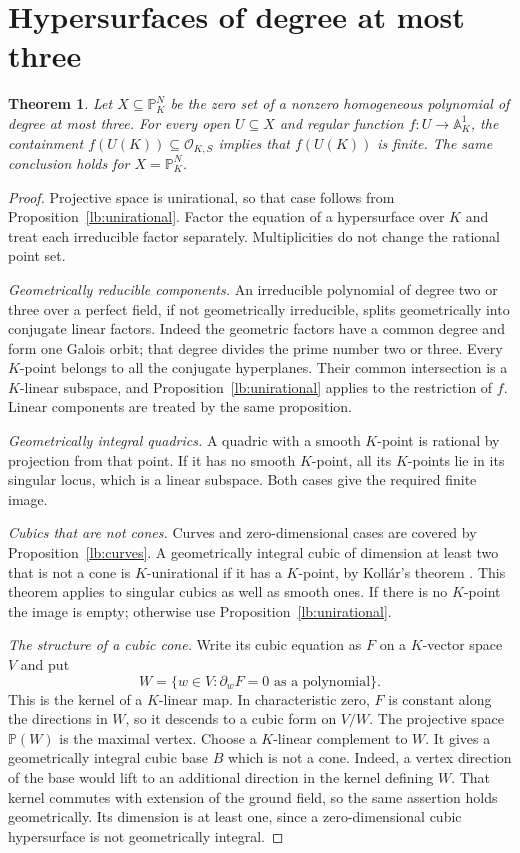 \documentclass[11pt,a4paper]{article}
\newtheorem{theorem}{Theorem}[section]
\theoremstyle{definition}
\newcommand{\OKS}{\mathcal O_{K,S}}
\newcommand{\A}{\mathbb A}
\newcommand{\PP}{\mathbb P}
\begin{document}
\section{Hypersurfaces of degree at most three}

\begin{theorem}\label{lb:cubic}
Let $X\subseteq\PP^N_K$ be the zero set of a nonzero homogeneous
polynomial of degree at most three. For every open $U\subseteq X$
and regular function $f:U\to\A^1_K$, the containment
$f(U(K))\subseteq\OKS$ implies that $f(U(K))$ is finite.
The same conclusion holds for $X=\PP^N_K$.
\end{theorem}
\begin{proof}
Projective space is unirational, so that case follows from
Proposition~\ref{lb:unirational}. Factor the equation of a hypersurface
over $K$ and treat each irreducible factor separately. Multiplicities
do not change the rational point set.

\emph{Geometrically reducible components.}
An irreducible polynomial of degree two or three over a perfect
field, if not geometrically irreducible, splits geometrically into
conjugate linear factors. Indeed the geometric factors have a common
degree and form one Galois orbit; that degree divides the prime
number two or three. Every $K$-point belongs to all the conjugate
hyperplanes. Their common intersection is a $K$-linear subspace,
and Proposition~\ref{lb:unirational} applies to the restriction of $f$.
Linear components are treated by the same proposition.

\emph{Geometrically integral quadrics.}
A quadric with a smooth $K$-point is rational by projection from
that point. If it has no smooth $K$-point, all its $K$-points lie
in its singular locus, which is a linear subspace. Both cases
give the required finite image.

\emph{Cubics that are not cones.}
Curves and zero-dimensional cases are covered by
Proposition~\ref{lb:curves}. A geometrically integral cubic of
dimension at least two that is not a cone is $K$-unirational if
it has a $K$-point, by Koll\'ar's theorem \cite[Theorem~2]{Kollar}.
This theorem applies to singular cubics as well as smooth ones.
If there is no $K$-point the image is empty; otherwise use
Proposition~\ref{lb:unirational}.

\emph{The structure of a cubic cone.}
Write its cubic equation as $F$ on a $K$-vector space $V$ and put
\[
 W=\{w\in V:\partial_wF=0\text{ as a polynomial}\}.
\]
This is the kernel of a $K$-linear map. In characteristic zero,
$F$ is constant along the directions in $W$, so it descends to
a cubic form on $V/W$. The projective space $\PP(W)$ is the
maximal vertex. Choose a $K$-linear complement to $W$. It gives
a geometrically integral cubic base $B$ which is not a cone.
Indeed, a vertex direction of the base would lift to an additional
direction in the kernel defining $W$. That kernel commutes with
extension of the ground field, so the same assertion holds geometrically.
Its dimension is at least one, since a zero-dimensional cubic
hypersurface is not geometrically integral.


\end{proof}
\end{document}
